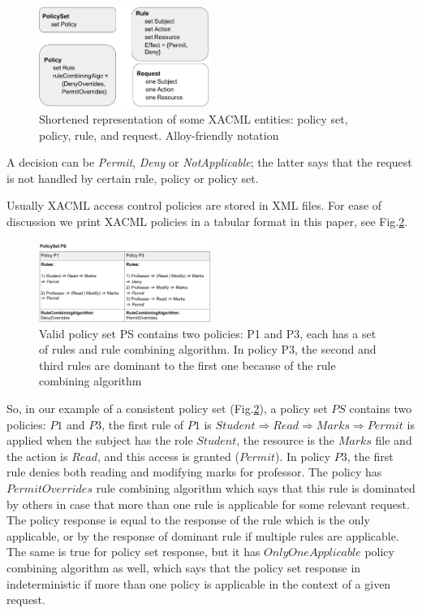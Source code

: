 \documentclass[letterpaper]{acm_proc_article-sp}
\begin{document}
\begin{figure}[h]
\includegraphics[width=0.5\textwidth]{model.png}
\caption{Shortened representation of some XACML entities: policy set, policy, rule, and request. Alloy-friendly notation}    
  \label{fig:model}
\end{figure}

A decision can be \textit{Permit}, \textit{Deny} or \textit{NotApplicable}; the latter says that the request is not handled by certain rule, policy or policy set. 

Usually XACML access control policies are stored in XML files. For ease of discussion we print XACML policies in a tabular format in this paper, see Fig.\ref{fig:policyset}.

\begin{figure}[h]
\includegraphics[width=0.5\textwidth]{policyset.png}
\caption{Valid policy set PS contains two policies: P1 and P3, each has a set of rules and rule combining algorithm. In policy P3, the second and third rules are dominant to the first one because of the rule combining algorithm}    
  \label{fig:policyset}
\end{figure}

So, in our example of a consistent policy set (Fig.\ref{fig:policyset}), a policy set $PS$ contains two policies: $P1$ and $P3$, the first rule of $P1$ is $Student \Rightarrow Read \Rightarrow Marks \Rightarrow Permit $ is applied when the subject has the role $Student$, the resource is the $Marks$ file and the action is $Read$, and this access is granted ($Permit$). In policy $P3$, the first rule denies both reading and modifying marks for professor. The policy has $PermitOverrides$ rule combining algorithm which says that this rule is dominated by others in case that more than one rule is applicable for some relevant request. The policy response is equal to the response of the rule which is the only applicable, or by the response of dominant rule if multiple rules are applicable. The same is true for policy set response, but it has $OnlyOneApplicable$ policy combining algorithm as well, which says that the policy set response in indeterministic if more than one policy is applicable in the context of a given request.
\end{document}
